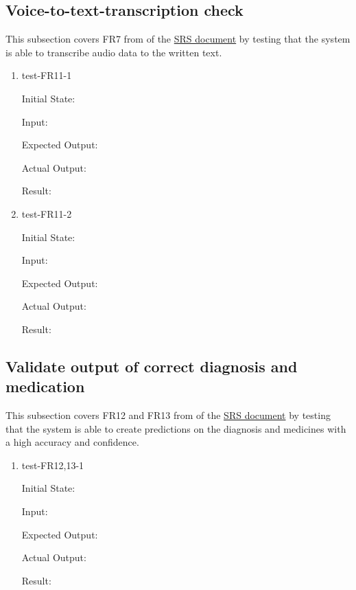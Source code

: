 \documentclass[12pt, titlepage]{article}
\begin{document}
\subsection{Voice-to-text-transcription check} \label{section:3.5}

This subsection covers FR7 from of the \href{https://github.com/Inreet-Kaur/capstone/blob/main/docs/SRS/SRS.pdf} {SRS document} by testing that the system is able to transcribe audio data to the written text.

\begin{enumerate}

  \item{test-FR11-1} \label{test-FR11-1}
  
  Initial State:

  Input:

  Expected Output:

  Actual Output:

  Result:


  \item{test-FR11-2} \label{test-FR11-2}

  Initial State:

  Input:

  Expected Output:

  Actual Output:

  Result:

\end{enumerate}

\subsection{Validate output of correct diagnosis and medication} \label{section:3.6}

This subsection covers FR12 and FR13 from of the \href{https://github.com/Inreet-Kaur/capstone/blob/main/docs/SRS/SRS.pdf} {SRS document} by testing that the system is able to create predictions on the diagnosis and medicines with a high accuracy and confidence.

\begin{enumerate}

  \item{test-FR12,13-1} \label{test-FR12,13-1}
  
  Initial State:

  Input:

  Expected Output:

  Actual Output:

  Result:

\end{enumerate}
\end{document}

